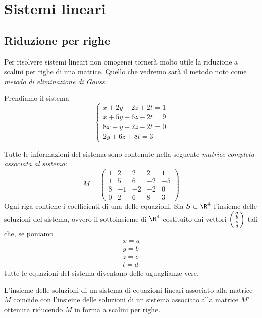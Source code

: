 \chapter{Sistemi lineari}

\section{Riduzione per righe}

Per risolvere sistemi lineari non omogenei tornerà molto utile la riduzione
a scalini per righe di una matrice. Quello che vedremo sarà il metodo noto come
\emph{metodo di	eliminazione di Gauss}.

\begin{example}
	Prendiamo il sistema
	\[
		\begin{cases}
			x + 2y + 2z + 2t = 1 \\
			x +5y + 6z -2t = 9   \\
			8x - y -2z -2t = 0   \\
			2y + 6z + 8t = 3
		\end{cases}
	\]

	Tutte le informazioni del sistema sono contenute nella seguente
	\emph{matrice completa associata al sistema}:
	\[
		M = \begin{pmatrix}
			1 & 2  & 2  & 2  & 1  \\
			1 & 5  & 6  & -2 & -5 \\
			8 & -1 & -2 & -2 & 0  \\
			0 & 2  & 6  & 8  & 3
		\end{pmatrix}
	\]
	Ogni riga contiene i coefficienti di una delle equazioni.
	Sia $S \subset \R^4$ l'insieme delle soluzioni del sistema, ovvero
	il sottoinsieme di $\R^4$ costituito dai vettori
	$\begin{psmallmatrix} a \\ b \\ c \\ d \end{psmallmatrix}$ tali che, se poniamo
	\begin{gather*}
		x = a \\
		y = b \\
		z = c \\
		t = d
	\end{gather*}
	tutte le equazioni del sistema diventano delle uguaglianze vere.
\end{example}


\begin{theorem}
	L'insieme delle soluzioni di un sistema di equazioni lineari associato alla
	matrice $M$ coincide con l'insieme delle soluzioni di un sistema associato
	alla matrice $M'$ ottenuta riducendo $M$ in forma a scalini per righe.
\end{theorem}

